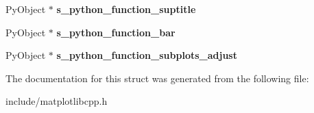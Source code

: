 \begin{DoxyCompactItemize}
\item 
Py\+Object $\ast$ {\bfseries s\+\_\+python\+\_\+function\+\_\+suptitle}\hypertarget{structmatplotlibcpp_1_1detail_1_1__interpreter_a20e9219a5ba76e7db9024c9f34faca70}{}\label{structmatplotlibcpp_1_1detail_1_1__interpreter_a20e9219a5ba76e7db9024c9f34faca70}

\item 
Py\+Object $\ast$ {\bfseries s\+\_\+python\+\_\+function\+\_\+bar}\hypertarget{structmatplotlibcpp_1_1detail_1_1__interpreter_ac6fa438b0d62b785e060acbef77007b4}{}\label{structmatplotlibcpp_1_1detail_1_1__interpreter_ac6fa438b0d62b785e060acbef77007b4}

\item 
Py\+Object $\ast$ {\bfseries s\+\_\+python\+\_\+function\+\_\+subplots\+\_\+adjust}\hypertarget{structmatplotlibcpp_1_1detail_1_1__interpreter_aecaf47e4932df6126e2f25e231001bbf}{}\label{structmatplotlibcpp_1_1detail_1_1__interpreter_aecaf47e4932df6126e2f25e231001bbf}

\end{DoxyCompactItemize}


The documentation for this struct was generated from the following file\+:\begin{DoxyCompactItemize}
\item 
include/matplotlibcpp.\+h\end{DoxyCompactItemize}
